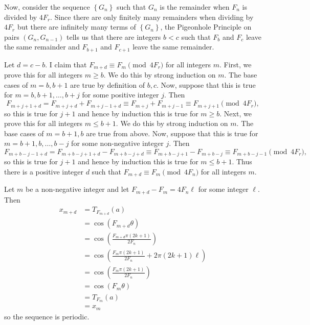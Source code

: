 Now, consider the sequence $\left\{G_n\right\}$ such that $G_n$ is the remainder when $F_n$ is divided by $4F_r$. Since there are only finitely many remainders when dividing by $4F_r$ but there are infinitely many terms of $\left\{G_n\right\}$, the Pigeonhole Principle on pairs $\left(G_n,G_{n-1}\right)$ tells us that there are integers $b<c$ such that $F_b$ and $F_c$ leave the same remainder and $F_{b+1}$ and $F_{c+1}$ leave the same remainder.

Let $d=c-b$. I claim that $F_{m+d}\equiv F_m\pmod{4F_r}$ for all integers $m$. First, we prove this for all integers $m\geq b$. We do this by strong induction on $m$. The base cases of $m=b,b+1$ are true by definition of $b,c$. Now, suppose that this is true for $m=b,b+1,\ldots,b+j$ for some positive integer $j$. Then \[F_{m+j+1+d}=F_{m+j+d}+F_{m+j-1+d}\equiv F_{m+j}+F_{m+j-1}\equiv F_{m+j+1}\pmod{4F_r},\] so this is true for $j+1$ and hence by induction this is true for $m\geq b$. Next, we prove this for all integers $m\leq b+1$. We do this by strong induction on $m$. The base cases of $m=b+1,b$ are true from above. Now, suppose that this is true for $m=b+1,b,\ldots,b-j$ for some non-negative integer $j$. Then \[F_{m+b-j-1+d}=F_{m+b-j+1+d}-F_{m+b-j+d}\equiv F_{m+b-j+1}-F_{m+b-j}\equiv F_{m+b-j-1}\pmod{4F_r},\] so this is true for $j+1$ and hence by induction this is true for $m\leq b+1$. Thus there is a positive integer $d$ such that $F_{m+d}\equiv F_m\pmod{4F_n}$ for all integers $m$.

Let $m$ be a non-negative integer and let $F_{m+d}-F_m=4F_n\ell$ for some integer $\ell$. Then
\begin{align*}
	x_{m+d}&=T_{F_{m+d}}\left(a\right)\\
	&=\cos\left(F_{m+d}\theta\right)\\
	&=\cos\left(\frac{F_{m+d}\pi\left(2k+1\right)}{2F_n}\right)\\
	&=\cos\left(\frac{F_m\pi\left(2k+1\right)}{2F_n}+2\pi\left(2k+1\right)\ell\right)\\
	&=\cos\left(\frac{F_m\pi\left(2k+1\right)}{2F_n}\right)\\
	&=\cos\left(F_m\theta\right)\\
	&=T_{F_m}\left(a\right)\\
	&=x_m
\end{align*}
so the sequence is periodic.